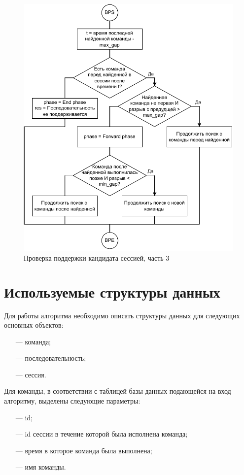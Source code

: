 \newpage
\begin{figure}[h!]
	\centering
	\includegraphics[width=1\textwidth]{inc/img/backward_phase.drawio.pdf}
	\caption{Проверка поддержки кандидата сессией, часть 3}
	\label{backward_phase}
\end{figure}

\newpage
\section{Используемые структуры данных}
Для работы алгоритма необходимо описать структуры данных для следующих основных объектов:
\begin{enumerate}
	\item[---] команда;
	\item[---] последовательность;
	\item[---] сессия.
\end{enumerate}

Для команды, в соответствии с таблицей базы данных подающейся на вход алгоритму, выделены следующие параметры:
\begin{itemize}
	\item[---] id; %
	\item[---] id сессии в течение которой была исполнена команда;
	\item[---] время в которое команда была выполнена;
	\item[---] имя команды.
\end{itemize}

